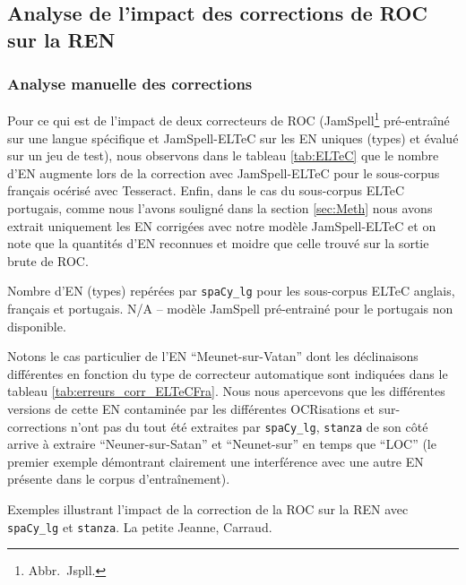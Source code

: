 \subsection{Analyse de l'impact des corrections de ROC sur la REN}
\subsubsection{Analyse manuelle des corrections }
Pour ce qui est de l'impact de deux correcteurs de ROC (JamSpell\footnote{Abbr.\ Jspll.} pré-entraîné sur une langue spécifique et JamSpell-ELTeC  sur les EN uniques (types) et évalué sur un jeu de test), nous observons dans le tableau \ref{tab:ELTeC} que le nombre d'EN augmente lors de la correction avec JamSpell-ELTeC pour le sous-corpus français océrisé avec Tesseract. 
Enfin, dans le cas du sous-corpus ELTeC portugais, comme nous l'avons souligné dans la section \ref{sec:Meth} nous avons extrait uniquement les EN corrigées avec notre modèle JamSpell-ELTeC et on note que la quantités d'EN reconnues et moidre que celle trouvé sur la sortie brute de ROC.
\begin{table}[h!]
    \centering
    \small
    
    \caption{Nombre d'EN (types) repérées par \texttt{spaCy\_lg} pour les sous-corpus ELTeC anglais, français et portugais. N/A -- modèle JamSpell pré-entrainé pour le portugais non disponible.}
    \label{tab:ELTeC}
\end{table}

Notons le cas particulier de l'EN ``Meunet-sur-Vatan'' dont les déclinaisons différentes en fonction du type de correcteur automatique sont indiquées dans le tableau \ref{tab:erreurs_corr_ELTeCFra}. Nous nous apercevons que les différentes versions de cette EN contaminée par les différentes OCRisations et sur-corrections n'ont pas du tout été extraites par \texttt{spaCy\_lg}, \texttt{stanza} de son côté arrive à extraire ``Neuner-sur-Satan'' et ``Neunet-sur'' en temps que ``LOC'' (le premier exemple démontrant clairement une interférence avec une autre EN présente dans le corpus d'entraînement).

\begin{table}[h!]
    \small
    \centering
   
     \caption{Exemples illustrant l'impact de la correction de la ROC sur la REN avec \texttt{spaCy\_lg} et \texttt{stanza}. {\normalfont La petite Jeanne}, Carraud.}
    \label{tab:erreurs_corr_ELTeCFra}
\end{table}

